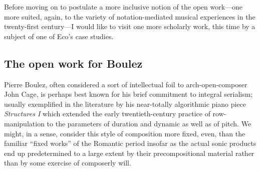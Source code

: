     Before moving on to postulate a more inclusive notion of the open work---one more suited, again, to the variety of notation-mediated musical experiences in the twenty-first century---I would like to visit one more scholarly work, this time by a subject of one of Eco's case studies.

    
    

\subsection{The open work for Boulez}
    

    Pierre Boulez, often considered a sort of intellectual foil to arch-open-composer John Cage, is perhaps best known for his brief commitment to integral serialism; usually exemplified in the literature by his near-totally algorithmic piano piece \textit{Structures I} which extended the early twentieth-century practice of row-manipulation to the parameters of duration and dynamic as well as of pitch. We might, in a sense, consider this style of composition more fixed, even, than the familiar ``fixed works'' of the Romantic period insofar as the actual sonic products end up predetermined to a large extent by their precompositional material rather than by some exercise of composerly will.
    
